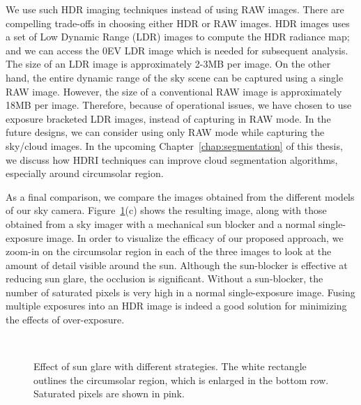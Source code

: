 We use such HDR imaging techniques instead of using RAW images. There are compelling trade-offs in choosing either HDR or RAW images. HDR images uses a set of Low Dynamic Range (LDR) images to compute the HDR radiance map; and we can access the 0EV LDR image which is needed for subsequent analysis. The size of an LDR image is approximately 2-3MB per image. On the other hand, the entire dynamic range of the sky scene can be captured using a single RAW image. However, the size of a conventional RAW image is approximately 18MB per image. Therefore, because of operational issues, we have chosen to use exposure bracketed LDR images, instead of capturing in RAW mode. In the future designs, we can consider using only RAW mode while capturing the sky/cloud images. In the upcoming Chapter~\ref{chap:segmentation} of this thesis, we discuss how HDRI techniques can improve cloud segmentation algorithms, especially around circumsolar region.


As a final comparison, we compare the images obtained from the different models of our sky camera. 
Figure~\ref{fig:sun-blocking}(c) shows the resulting image, along with those obtained from a sky imager with a mechanical sun blocker and a normal single-exposure image. In order to visualize the efficacy of our proposed approach, we zoom-in on the circumsolar region in each of the three images to look at the amount of detail visible around the sun. Although the sun-blocker is effective at reducing sun glare, the occlusion is significant. Without a sun-blocker, the number of saturated pixels is very high in a normal single-exposure image. Fusing multiple exposures into an HDR image is indeed a good solution for minimizing the effects of over-exposure.


\begin{figure}[htb]
\begin{center}
\\
\vspace{-2.5mm}
\caption[Effect of sun glare with different strategies for sun occlusion.]{Effect of sun glare with different strategies.  The white rectangle outlines the circumsolar region, which is enlarged in the bottom row. Saturated pixels are shown in pink.
\label{fig:sun-blocking}}
\end{center}
\end{figure}

